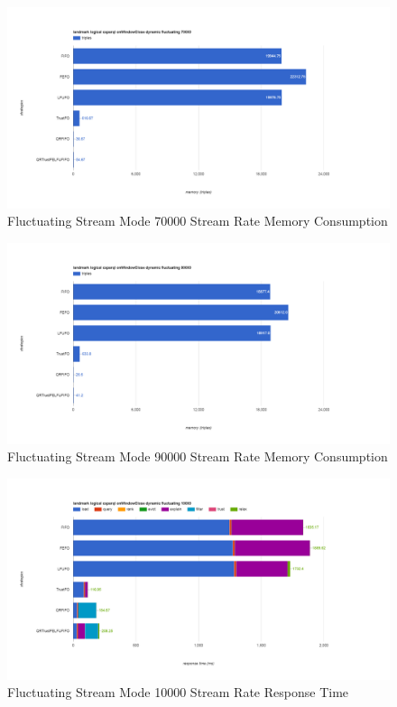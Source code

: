 \begin{figure}[!htbp]
    \centering
    \includegraphics[width=\textwidth]{img/app3-f-70000-m.png}
    \caption{Fluctuating Stream Mode 70000 Stream Rate Memory Consumption}
\end{figure}
\begin{figure}[!htbp]
    \centering
    \includegraphics[width=\textwidth]{img/app3-f-90000-m.png}
    \caption{Fluctuating Stream Mode 90000 Stream Rate Memory Consumption}
\end{figure}
\begin{figure}[!htbp]
    \centering
    \includegraphics[width=\textwidth]{img/app3-f-10000-r.png}
    \caption{Fluctuating Stream Mode 10000 Stream Rate Response Time}
\end{figure}
